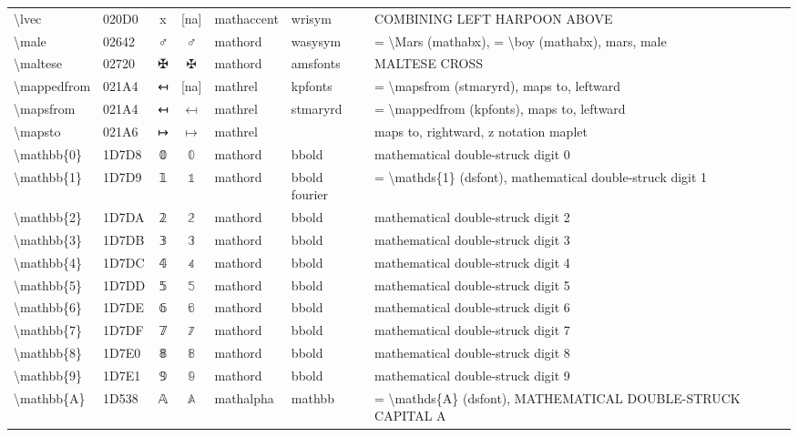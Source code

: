 \documentclass[a4paper,landscape]{article}
\begin{document}
\begin{longtable}{llcclll}
\textbackslash{}lvec & 020D0 & x⃐ & [na] & mathaccent & wrisym & COMBINING LEFT HARPOON ABOVE \\
\textbackslash{}male & 02642 & \textsf ♂ & $\male$ & mathord & wasysym & = \textbackslash{}Mars (mathabx), = \textbackslash{}boy (mathabx), mars, male \\
\textbackslash{}maltese & 02720 & ✠ & $\maltese$ & mathord & amsfonts & MALTESE CROSS \\
\textbackslash{}mappedfrom & 021A4 & ↤ & [na] & mathrel & kpfonts & = \textbackslash{}mapsfrom (stmaryrd),  maps to,  leftward \\
\textbackslash{}mapsfrom & 021A4 & ↤ & $\mapsfrom$ & mathrel & stmaryrd & = \textbackslash{}mappedfrom (kpfonts), maps to, leftward \\
\textbackslash{}mapsto & 021A6 & ↦ & $\mapsto$ & mathrel &  & maps to, rightward, z notation maplet \\
\textbackslash{}mathbb\{0\} & 1D7D8 & 𝟘 & $\mathbb{0}$ & mathord & bbold & mathematical double-struck digit 0 \\
\textbackslash{}mathbb\{1\} & 1D7D9 & 𝟙 & $\mathbb{1}$ & mathord & bbold fourier & = \textbackslash{}mathds\{1\} (dsfont), mathematical double-struck digit 1 \\
\textbackslash{}mathbb\{2\} & 1D7DA & 𝟚 & $\mathbb{2}$ & mathord & bbold & mathematical double-struck digit 2 \\
\textbackslash{}mathbb\{3\} & 1D7DB & 𝟛 & $\mathbb{3}$ & mathord & bbold & mathematical double-struck digit 3 \\
\textbackslash{}mathbb\{4\} & 1D7DC & 𝟜 & $\mathbb{4}$ & mathord & bbold & mathematical double-struck digit 4 \\
\textbackslash{}mathbb\{5\} & 1D7DD & 𝟝 & $\mathbb{5}$ & mathord & bbold & mathematical double-struck digit 5 \\
\textbackslash{}mathbb\{6\} & 1D7DE & 𝟞 & $\mathbb{6}$ & mathord & bbold & mathematical double-struck digit 6 \\
\textbackslash{}mathbb\{7\} & 1D7DF & 𝟟 & $\mathbb{7}$ & mathord & bbold & mathematical double-struck digit 7 \\
\textbackslash{}mathbb\{8\} & 1D7E0 & 𝟠 & $\mathbb{8}$ & mathord & bbold & mathematical double-struck digit 8 \\
\textbackslash{}mathbb\{9\} & 1D7E1 & 𝟡 & $\mathbb{9}$ & mathord & bbold & mathematical double-struck digit 9 \\
\textbackslash{}mathbb\{A\} & 1D538 & 𝔸 & $\mathbb{A}$ & mathalpha & mathbb & = \textbackslash{}mathds\{A\} (dsfont), MATHEMATICAL DOUBLE-STRUCK CAPITAL A \\

\end{longtable}
\end{document}
